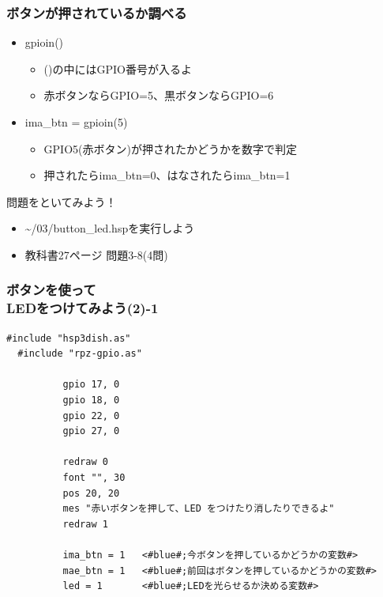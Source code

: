\begin{frame}
  \frametitle{ボタンが押されているか調べる}
  \begin{itemize}
    \item gpioin()
          \begin{itemize}
            \item ()の中にはGPIO番号が入るよ
            \item 赤ボタンならGPIO=5、黒ボタンならGPIO=6
          \end{itemize}
    \item ima\_btn = gpioin(5)
          \begin{itemize}
            \item GPIO5(赤ボタン)が押されたかどうかを数字で判定
            \item 押されたらima\_btn=0、はなされたらima\_btn=1
          \end{itemize}
  \end{itemize}
\end{frame}

\begin{frame}
  \begin{exampleblock}{問題をといてみよう！}
    \begin{itemize}
      \item \sim/03/button\_led.hspを実行しよう
      \item 教科書27ページ 問題3-8(4問)
    \end{itemize}
  \end{exampleblock} 
\end{frame}

\begin{frame}[fragile]
  \frametitle{ボタンを使って\\LEDをつけてみよう(2)-1}
  \begin{lstlisting}[title=\sim/03/button\_led2.hsp 前半, label=button_led2.hsp-1]
  #include "hsp3dish.as"
  #include "rpz-gpio.as"
  
          gpio 17, 0
          gpio 18, 0
          gpio 22, 0
          gpio 27, 0
        
          redraw 0
          font "", 30
          pos 20, 20
          mes "赤いボタンを押して、LED をつけたり消したりできるよ"
          redraw 1

          ima_btn = 1   <#blue#;今ボタンを押しているかどうかの変数#>
          mae_btn = 1   <#blue#;前回はボタンを押しているかどうかの変数#>
          led = 1       <#blue#;LEDを光らせるか決める変数#>
  \end{lstlisting}
\end{frame}

